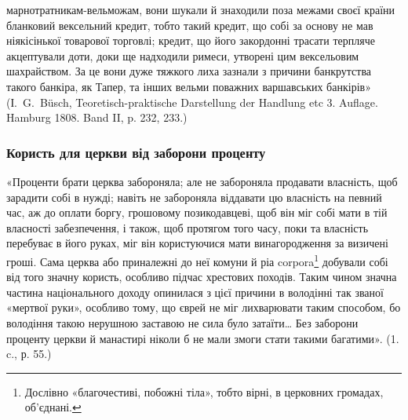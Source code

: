 \parcont{}  %
марнотратникам-вельможам, вони шукали й знаходили поза межами своєї країни
бланковий вексельний кредит, тобто такий кредит, що собі за основу не мав
ніякісінької товарової торговлі; кредит, що його закордонні трасати терпляче
акцептували доти, доки ще надходили римеси, утворені цим вексельовим шахрайством.
За це вони дуже тяжкого лиха зазнали з причини банкрутства такого
банкіра, як Тапер, та інших вельми поважних варшавських банкірів» (І.~G.~Büsch,
Teoretisch-praktische Darstellung der Handlung etc 3. Auflage. Hamburg 1808. Band
II, p. 232, 233.)

\subsubsection{Користь для церкви від заборони проценту}

«Проценти брати церква забороняла; але не забороняла продавати власність,
щоб зарадити собі в нужді; навіть не забороняла віддавати цю власність
на певний час, аж до оплати боргу, грошовому позикодавцеві, щоб він міг собі
мати в тій власності забезпечення, і також, щоб протягом того часу, поки та
власність перебуває в його руках, міг він користуючися мати винагородження
за визичені гроші. Сама церква або приналежні до неї комуни й ріа corpora\footnote*{
Дослівно «благочестиві, побожні тіла», тобто вірні, в церковних громадах,
об’єднані. 
} добували
собі від того значну користь, особливо підчас хрестових походів. Таким
чином значна частина національного доходу опинилася з цієї причини в володінні
так званої «мертвої руки», особливо тому, що єврей не міг лихварювати таким
способом, бо володіння такою нерушною заставою не сила було затаїти\dots{} Без
заборони проценту церкви й манастирі ніколи б не мали змоги стати такими
багатими». (1. c., р. 55.)

